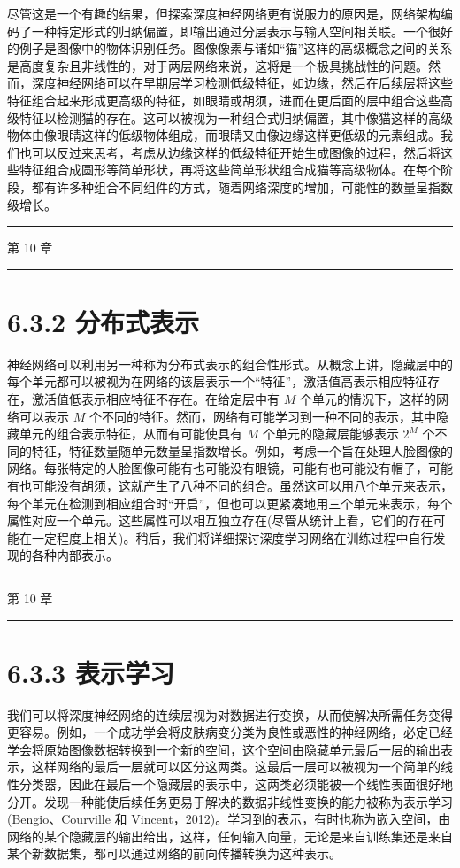 \documentclass[10pt]{report}
\newcommand{\HRule}{\begin{center}\rule{0.9\linewidth}{0.2mm}\end{center}}
\begin{document}
尽管这是一个有趣的结果，但探索深度神经网络更有说服力的原因是，网络架构编码了一种特定形式的归纳偏置，即输出通过分层表示与输入空间相关联。一个很好的例子是图像中的物体识别任务。图像像素与诸如“猫”这样的高级概念之间的关系是高度复杂且非线性的，对于两层网络来说，这将是一个极具挑战性的问题。然而，深度神经网络可以在早期层学习检测低级特征，如边缘，然后在后续层将这些特征组合起来形成更高级的特征，如眼睛或胡须，进而在更后面的层中组合这些高级特征以检测猫的存在。这可以被视为一种组合式归纳偏置，其中像猫这样的高级物体由像眼睛这样的低级物体组成，而眼睛又由像边缘这样更低级的元素组成。我们也可以反过来思考，考虑从边缘这样的低级特征开始生成图像的过程，然后将这些特征组合成圆形等简单形状，再将这些简单形状组合成猫等高级物体。在每个阶段，都有许多种组合不同组件的方式，随着网络深度的增加，可能性的数量呈指数级增长。

\HRule

第 10 章

\HRule

\section*{6.3.2 分布式表示}

神经网络可以利用另一种称为分布式表示的组合性形式。从概念上讲，隐藏层中的每个单元都可以被视为在网络的该层表示一个“特征”，激活值高表示相应特征存在，激活值低表示相应特征不存在。在给定层中有 \(M\) 个单元的情况下，这样的网络可以表示 \(M\) 个不同的特征。然而，网络有可能学习到一种不同的表示，其中隐藏单元的组合表示特征，从而有可能使具有 \(M\) 个单元的隐藏层能够表示 \({2}^{M}\) 个不同的特征，特征数量随单元数量呈指数增长。例如，考虑一个旨在处理人脸图像的网络。每张特定的人脸图像可能有也可能没有眼镜，可能有也可能没有帽子，可能有也可能没有胡须，这就产生了八种不同的组合。虽然这可以用八个单元来表示，每个单元在检测到相应组合时“开启”，但也可以更紧凑地用三个单元来表示，每个属性对应一个单元。这些属性可以相互独立存在(尽管从统计上看，它们的存在可能在一定程度上相关)。稍后，我们将详细探讨深度学习网络在训练过程中自行发现的各种内部表示。

\HRule

第 10 章

\HRule

\section*{6.3.3 表示学习}

我们可以将深度神经网络的连续层视为对数据进行变换，从而使解决所需任务变得更容易。例如，一个成功学会将皮肤病变分类为良性或恶性的神经网络，必定已经学会将原始图像数据转换到一个新的空间，这个空间由隐藏单元最后一层的输出表示，这样网络的最后一层就可以区分这两类。这最后一层可以被视为一个简单的线性分类器，因此在最后一个隐藏层的表示中，这两类必须能被一个线性表面很好地分开。发现一种能使后续任务更易于解决的数据非线性变换的能力被称为表示学习(Bengio、Courville 和 Vincent，2012)。学习到的表示，有时也称为嵌入空间，由网络的某个隐藏层的输出给出，这样，任何输入向量，无论是来自训练集还是来自某个新数据集，都可以通过网络的前向传播转换为这种表示。
\end{document}

